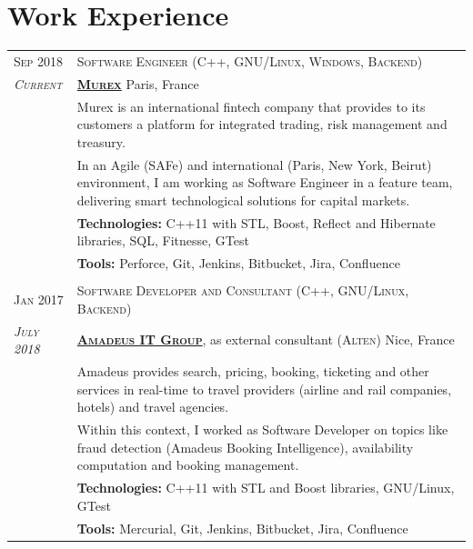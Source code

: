 \documentclass[a4paper,10pt]{article}
\begin{document}
	\vspace{-5mm}

	\section{Work Experience}
	\begin{tabular}{p{1.7cm}|p{15.5cm}}
		\centering\textsc{Sep 2018} &
		\textsc{Software Engineer (C++, GNU/Linux, Windows, Backend)} \\
		\centering\emph{\textsc{Current}} &
		\textsc{\textbf{\href{https://www.murex.com/}{Murex}}}  \hfill Paris, France\\
		& Murex is an international fintech company that provides to its customers a platform for integrated trading, risk management and treasury.\\
		& In an Agile (SAFe) and international (Paris, New York, Beirut) environment, I am working as Software Engineer in a feature team, delivering smart technological solutions for capital markets.\\
		& \textbf{Technologies:} C++11 with STL, Boost, Reflect and Hibernate libraries, SQL, Fitnesse, GTest\\
		& \textbf{Tools:} Perforce, Git, Jenkins, Bitbucket, Jira, Confluence\\
		
		\multicolumn{2}{c}{} \\
		\centering\textsc{Jan 2017} &
		\textsc{Software Developer and Consultant (C++, GNU/Linux, Backend)} \\
		\centering\emph{\textsc{July 2018}} &
		\textsc{\textbf{\href{http://www.amadeus.com/}{Amadeus IT Group}}}, as external consultant (\textsc{Alten}) \hfill Nice, France\\
		& Amadeus provides search, pricing, booking, ticketing and other services in real-time to travel providers (airline and rail companies, hotels) and travel agencies.\\
		& Within this context, I worked as Software Developer on topics like fraud detection (Amadeus Booking Intelligence), availability computation and booking management.\\		
		& \textbf{Technologies:} C++11 with STL and Boost libraries, GNU/Linux, GTest\\
		& \textbf{Tools:} Mercurial, Git, Jenkins, Bitbucket, Jira, Confluence\\


\end{tabular}
\end{document}
